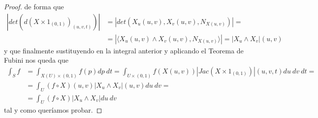 \begin{prop}
\begin{proof}
        de forma que 
        \begin{align*}
            |det(d(X\times 1_{(0,1)})_{(u,v,t)})| &= 
            |det(X_u(u,v), X_v(u,v), N_{X(u,v)})| = \\
            &=
            |\langle X_u(u,v)\wedge X_v(u,v), N_{X(u,v)} \rangle | = | X_u \wedge X_v |(u,v)
        \end{align*}
        y que finalmente sustituyendo en la integral anterior y aplicando el Teorema de Fubini nos queda que 
        \begin{align*}
            \int_S f &=
            \int_{X(U)\times (0,1)} f(p) dp\ dt  =
            \int_{U\times(0,1)} f(X(u,v)) |Jac(X\times 1_{(0,1)})|(u,v,t) du\ dv\ dt = \\
            &=
            \int_{U} (f\circ X)(u,v) |X_u\wedge X_v|(u,v) du\ dv =\\
            &= \int_{U} (f\circ X)|X_u\wedge X_v| du\ dv
        \end{align*}
        tal y como queríamos probar.
    \end{proof}
\end{prop}

